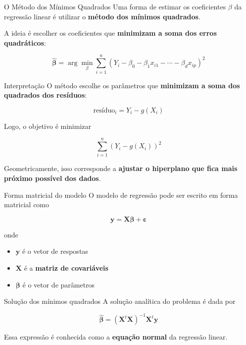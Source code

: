 \documentclass[
  ignorenonframetext,
  aspectratio=169,
]{beamer}
\providecommand{\tightlist}{%
  \setlength{\itemsep}{0pt}\setlength{\parskip}{0pt}}
\begin{document}
\begin{frame}{O Método dos Mínimos Quadrados}
\label{o-muxe9todo-dos-muxednimos-quadrados}
Uma forma de estimar os coeficientes \(\beta\) da regressão linear é
utilizar o \textbf{método dos mínimos quadrados}.

A ideia é escolher os coeficientes que \textbf{minimizam a soma dos
erros quadráticos}:

\[
\hat{\boldsymbol{\beta}} =
\arg\min_{\beta}
\sum_{i=1}^{n}
\left(
Y_i - \beta_0 - \beta_1 x_{i1} - \cdots - \beta_d x_{ip}
\right)^2
\]
\end{frame}

\begin{frame}
\begin{block}{Interpretação}
\label{interpretauxe7uxe3o}
O método escolhe os parâmetros que \textbf{minimizam a soma dos
quadrados dos resíduos}:

\[
\text{resíduo}_i = Y_i - g(X_i)
\]

Logo, o objetivo é minimizar

\[
\sum_{i=1}^{n} (Y_i - g(X_i))^2
\]

Geometricamente, isso corresponde a \textbf{ajustar o hiperplano que
fica mais próximo possível dos dados}.
\end{block}
\end{frame}

\begin{frame}
\begin{block}{Forma matricial do modelo}
\label{forma-matricial-do-modelo}
O modelo de regressão pode ser escrito em forma matricial como

\[
\boldsymbol{y} = \boldsymbol{X} \boldsymbol{\beta} + \boldsymbol{\varepsilon}
\]

onde

\begin{itemize}
\tightlist
\item
  \(\boldsymbol{y}\) é o vetor de respostas
\item
  \(\boldsymbol{X}\) é a \textbf{matriz de covariáveis}
\item
  \(\boldsymbol{\beta}\) é o vetor de parâmetros
\end{itemize}
\end{block}
\end{frame}

\begin{frame}
\begin{block}{Solução dos mínimos quadrados}
\label{soluuxe7uxe3o-dos-muxednimos-quadrados}
A solução analítica do problema é dada por

\[
\hat{\boldsymbol{\beta}} = (\boldsymbol{X}^t \boldsymbol{X})^{-1} \boldsymbol{X}^t \boldsymbol{y}
\]

Essa expressão é conhecida como a \textbf{equação normal} da regressão
linear.
\end{block}
\end{frame}
\end{document}
